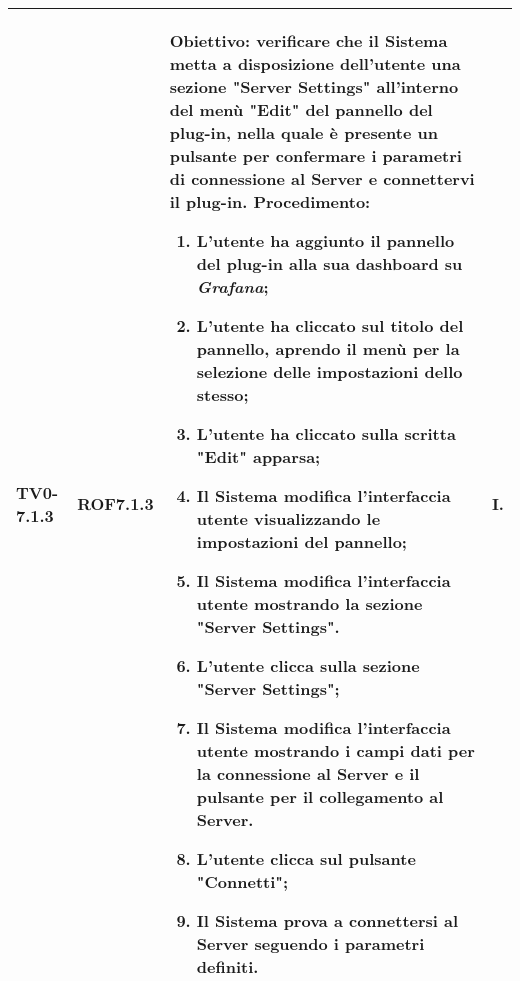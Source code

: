 \begin{longtable}{|C{.15\textwidth}|C{.13\textwidth}|m{.52\textwidth}|C{.08\textwidth}|}
TV0-7.1.3 & ROF7.1.3 &
	\textbf{Obiettivo}: verificare che il Sistema metta a disposizione dell'utente una sezione "Server Settings" all'interno del menù "Edit" del pannello del plug-in, nella quale è presente un pulsante per confermare i parametri di connessione al Server e connettervi il plug-in. \newline
	\textbf{Procedimento}:
	\begin{enumerate}
		\item L'utente ha aggiunto il pannello del plug-in alla sua dashboard su \textit{Grafana};
		\item L'utente ha cliccato sul titolo del pannello, aprendo il menù per la selezione delle impostazioni dello stesso;
		\item L'utente ha cliccato sulla scritta "Edit" apparsa;
		\item Il Sistema modifica l'interfaccia utente visualizzando le impostazioni del pannello;
		\item Il Sistema modifica l'interfaccia utente mostrando la sezione "Server Settings".
		\item L'utente clicca sulla sezione "Server Settings";
		\item Il Sistema modifica l'interfaccia utente mostrando i campi dati per la connessione al Server e il pulsante per il collegamento al Server.
		\item L'utente clicca sul pulsante "Connetti";
		\item Il Sistema prova a connettersi al Server seguendo i parametri definiti.
	\end{enumerate}
	& I. \\
\hline


\end{longtable}
